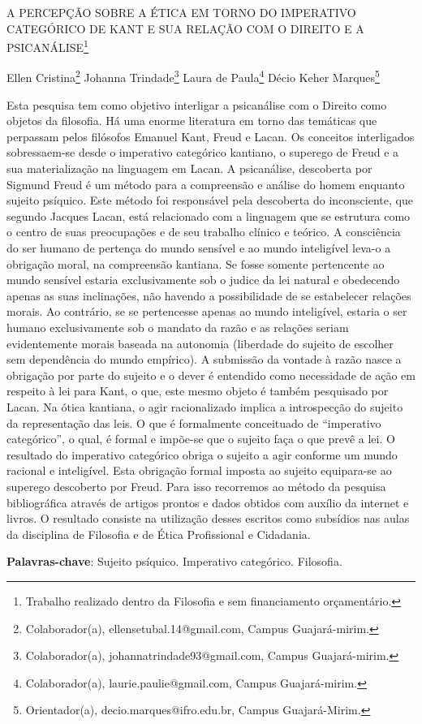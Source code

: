 \documentclass[article,12pt,onesidea,4paper,english,brazil]{abntex2}
\begin{document}
	
	
	\frenchspacing 
	
	\begin{center}
		\LARGE A PERCEPÇÃO SOBRE A ÉTICA EM TORNO DO IMPERATIVO CATEGÓRICO
		DE KANT E SUA RELAÇÃO COM O DIREITO E A PSICANÁLISE\footnote{Trabalho realizado dentro da Filosofia e sem financiamento orçamentário.}
		
		\normalsize
	Ellen Cristina\footnote{Colaborador(a), ellensetubal.14@gmail.com, Campus Guajará-mirim.} 
		Johanna Trindade\footnote{Colaborador(a), johannatrindade93@gmail.com, Campus Guajará-mirim.} 
		Laura de Paula\footnote{Colaborador(a), laurie.paulie@gmail.com, Campus Guajará-mirim.} 
		Décio Keher Marques\footnote{Orientador(a), decio.marques@ifro.edu.br, Campus Guajará-Mirim.} 
	\end{center}
	
	\noindent Esta pesquisa tem como objetivo interligar a psicanálise com o Direito como objetos
	da filosofia. Há uma enorme literatura em torno das temáticas que perpassam pelos
	filósofos Emanuel Kant, Freud e Lacan. Os conceitos interligados sobressaem-se
	desde o imperativo categórico kantiano, o superego de Freud e a sua materialização
	na linguagem em Lacan. A psicanálise, descoberta por Sigmund Freud é um método
	para a compreensão e análise do homem enquanto sujeito psíquico. Este método foi
	responsável pela descoberta do inconsciente, que segundo Jacques Lacan, está
	relacionado com a linguagem que se estrutura como o centro de suas preocupações
	e de seu trabalho clínico e teórico. A consciência do ser humano de pertença do
	mundo sensível e ao mundo inteligível leva-o a obrigação moral, na compreensão
	kantiana. Se fosse somente pertencente ao mundo sensível estaria exclusivamente
	sob o judice da lei natural e obedecendo apenas as suas inclinações, não havendo a
	possibilidade de se estabelecer relações morais. Ao contrário, se se pertencesse
	apenas ao mundo inteligível, estaria o ser humano exclusivamente sob o mandato
	da razão e as relações seriam evidentemente morais baseada na autonomia
	(liberdade do sujeito de escolher sem dependência do mundo empírico). A
	submissão da vontade à razão nasce a obrigação por parte do sujeito e o dever é
	entendido como necessidade de ação em respeito à lei para Kant, o que, este
	mesmo objeto é também pesquisado por Lacan. Na ótica kantiana, o agir
	racionalizado implica a introspecção do sujeito da representação das leis. O que é
	formalmente conceituado de “imperativo categórico”, o qual, é formal e impõe-se que
	o sujeito faça o que prevê a lei. O resultado do imperativo categórico obriga o sujeito
	a agir conforme um mundo racional e inteligível. Esta obrigação formal imposta ao
	sujeito equipara-se ao superego descoberto por Freud. Para isso recorremos ao
	método da pesquisa bibliográfica através de artigos prontos e dados obtidos com
	auxílio da internet e livros. O resultado consiste na utilização desses escritos como
	subsídios nas aulas da disciplina de Filosofia e de Ética Profissional e Cidadania.
	
	\vspace{\onelineskip}
	
	\noindent
	\textbf{Palavras-chave}: Sujeito psíquico. Imperativo categórico. Filosofia.
	
\end{document}
